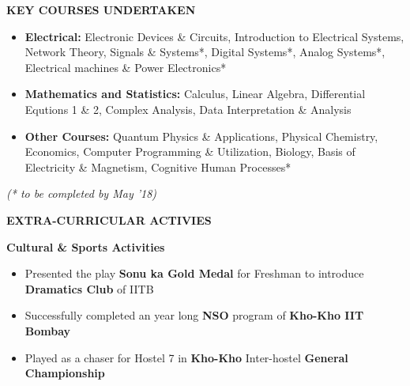\documentclass[11pt]{article}%
\begin{document}
\vspace{-0.2cm}

\begin{flushleft}
\bf{\LARGE{K}\Large{EY} \LARGE{C}\Large{OURSES} \LARGE{U}\Large{NDERTAKEN}}
\end{flushleft}
\vspace{-2mm}
\hline

\vspace{-0.2cm}
\begin{itemize}
\setlength\itemsep{0.01em}
\item \textbf{Electrical:} \nohyphens{Electronic Devices \& Circuits, Introduction to Electrical Systems, Network Theory, Signals \& Systems*, Digital Systems*, Analog Systems*, Electrical machines \& Power Electronics*}

\item \textbf{Mathematics and Statistics:} \nohyphens{Calculus, Linear Algebra, Differential Equtions 1 \& 2, Complex Analysis, Data Interpretation \& Analysis}
\item \textbf{Other Courses:} \nohyphens{Quantum Physics \& Applications, Physical Chemistry, Economics, Computer Programming \& Utilization, Biology, Basis of Electricity \& Magnetism, Cognitive Human Processes*}
\end{itemize}
\vspace{-4mm}
\hfill {{{\em{(* to be completed by May '18)}}}}









\vspace{-0.6cm}
\begin{flushleft}
\bf{\LARGE{E}\Large{XTRA-}\LARGE{C}\Large{URRICULAR} \LARGE{A}\Large{CTIVIES}}
\end{flushleft}
\vspace{-2mm}
\hline
\vspace{-0.2cm}
{\flushleft \bf \large{Cultural \& Sports Activities}}
\begin{itemize}
    \setlength\itemsep{0.01em}
    \vspace{-0.2cm}
    \item Presented the play \textbf{Sonu ka Gold Medal} for Freshman to introduce \textbf{Dramatics Club} of IITB
    \item \nohyphens{Successfully completed an year long \textbf{NSO} program of \textbf{Kho-Kho IIT Bombay}}
    \item Played as a chaser for Hostel 7 in \textbf{Kho-Kho} Inter-hostel \textbf{General Championship}

    
\end{itemize}
\end{document}
